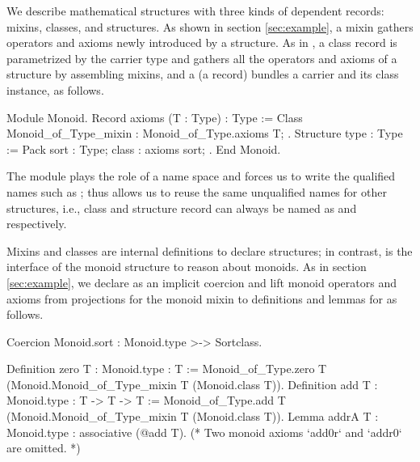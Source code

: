 \documentclass[a4paper,UKenglish,cleveref, autoref]{lipics-v2019}
\newcommand{\mixin}{mixin}
\theoremstyle{implem}
\theoremstyle{implem}
\theoremstyle{command}
\begin{document}
We describe mathematical structures with three kinds of dependent records: mixins, classes, and structures.
As shown in section \ref{sec:example}, a \mixin{} gathers operators and axioms newly introduced by a structure.
As in \cite[section 2.4]{DBLP:conf/tphol/GarillotGMR09}\cite[section 2]{KSdraft}, a class record is parametrized by the carrier type  and gathers all the operators and axioms of a structure by assembling mixins, and a  (a record) bundles a carrier and its class instance, as follows.
\begin{coqcode}
Module Monoid.
Record axioms (T : Type) : Type :=
  Class { Monoid_of_Type_mixin : Monoid_of_Type.axioms T; }.
Structure type : Type := Pack { sort : Type; class : axioms sort; }.
End Monoid.
\end{coqcode}
The  module plays the role of a name space and forces us to write the qualified names such as ; thus allows us to reuse the same unqualified names for other structures, i.e., class and structure record can always be named as  and  respectively.

Mixins and classes are internal definitions to declare structures; in contrast,  is the interface of the monoid structure to reason about monoids.
As in section \ref{sec:example}, we declare  as an implicit coercion and lift monoid operators and axioms from projections for the monoid \mixin{} to definitions and lemmas for  as follows.
\begin{coqcode}
Coercion Monoid.sort : Monoid.type >-> Sortclass.

Definition zero {T : Monoid.type} : T :=
  Monoid_of_Type.zero T (Monoid.Monoid_of_Type_mixin T (Monoid.class T)).
Definition add {T : Monoid.type} : T -> T -> T :=
  Monoid_of_Type.add T (Monoid.Monoid_of_Type_mixin T (Monoid.class T)).
Lemma addrA {T : Monoid.type} : associative (@add T).
(* Two monoid axioms `add0r` and `addr0` are omitted. *)
\end{coqcode}
\end{document}
